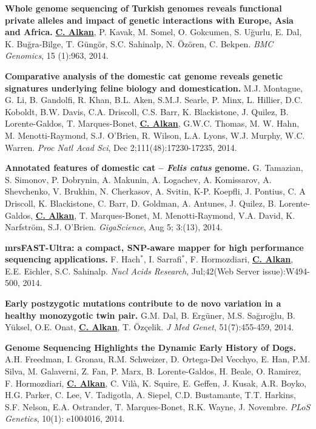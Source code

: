   \vspace{-.2cm}        
  {\bf Whole genome sequencing of Turkish genomes reveals functional private alleles and impact of genetic interactions with Europe, Asia and Africa.}
  {\bf {\underline {C. Alkan}}}, P. Kavak, M. Somel, O. Gokcumen, S. Uğurlu, E. Dal, K. Buğra-Bilge,  T. Güngör, S.C. Sahinalp, N. Özören, C. Bekpen.
  {\em BMC Genomics}, 15 (1):963, 2014.


  \vspace{-.2cm}        
  {\bf Comparative analysis of the domestic cat genome reveals genetic signatures underlying feline biology and domestication.}
  M.J. Montague, G. Li, B. Gandolfi, R. Khan, B.L. Aken, S.M.J. Searle, P. Minx, L. Hillier, D.C. Koboldt, B.W. Davis, C.A. Driscoll, 
  C.S. Barr, K. Blackistone, J. Quilez, B. Lorente-Galdos, T. Marques-Bonet, {\bf {\underline {C. Alkan}}}, G.W.C. Thomas, M. W. Hahn, M. Menotti-Raymond, 
  S.J. O’Brien, R. Wilson, L.A. Lyons, W.J. Murphy, W.C. Warren. {\em Proc Natl Acad Sci}, Dec 2;111(48):17230-17235, 2014.


  \vspace{-.2cm}        
  {\bf Annotated features of domestic cat – \textit{Felis catus} genome.}
  G. Tamazian, S. Simonov, P. Dobrynin, A. Makunin, A. Logachev, 
  A. Komissarov, A. Shevchenko, V. Brukhin, N. Cherkasov, A. Svitin,
  K-P. Koepfli, J. Pontius, C. A Driscoll, K. Blackistone, C. Barr, 
  D. Goldman, A. Antunes, J. Quilez, B. Lorente-Galdos,  {\bf {\underline {C. Alkan}}},
  T. Marques-Bonet, M. Menotti-Raymond, V.A. David, K. Narfström, S.J. O’Brien.
  {\em GigaScience}, Aug 5; 3:(13), 2014.
                                       
  \vspace{-.2cm}        
  {\bf mrsFAST-Ultra: a compact, SNP-aware mapper for high performance sequencing applications.}
    F. Hach$^*$,
    I. Sarrafi$^*$,
    F. Hormozdiari,
    {\bf {\underline {C. Alkan}}},
    E.E. Eichler,   S.C. Sahinalp.
    {\em Nucl Acids Research}, Jul;42(Web Server issue):W494-500, 2014.

  \vspace{-.2cm}        
         {\bf Early postzygotic mutations contribute to de novo variation in a healthy monozygotic twin pair.}
         G.M. Dal, B. Ergüner, M.S. Sağıroğlu, B. Yüksel, O.E. Onat, {\bf {\underline {C. Alkan}}}, T. Özçelik. 
         {\em J Med Genet}, 51(7):455-459, 2014.


  \vspace{-.2cm}        
         {\bf Genome Sequencing Highlights the Dynamic Early History of Dogs.} 
         A.H. Freedman, I. Gronau, R.M. Schweizer, D. Ortega-Del Vecchyo, E. Han, P.M. Silva, 
         M. Galaverni, Z. Fan, P. Marx, B. Lorente-Galdos, H. Beale, O. Ramirez, F. Hormozdiari, 
         {\bf {\underline {C. Alkan}}}, 
         C. Vilà, K. Squire, E. Geffen, J. Kusak, A.R. Boyko, H.G. Parker, 
         C. Lee, V. Tadigotla, A. Siepel, C.D. Bustamante, T.T. Harkins, S.F. Nelson, 
         E.A. Ostrander, T. Marques-Bonet, R.K. Wayne, J. Novembre. 
         {\em PLoS Genetics}, 10(1): e1004016, 2014.


